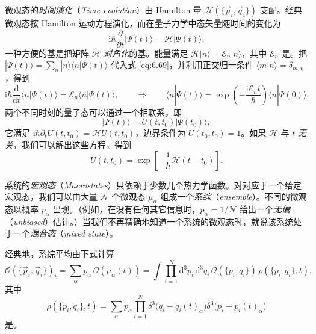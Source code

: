 \begin{itemize}[leftmargin=1.6em,itemsep=0.4em]
微观态的\emph{时间演化}（\textit{Time evolution}）由 Hamilton 量 $\mathscr H(\{\vec p_i,\vec q_i\})$ 支配。经典微观态按 Hamilton 运动方程演化，而在量子力学中态矢量随时间的变化为
\begin{equation}\label{eq:6.69}
\mathrm i\hbar\frac{\partial}{\partial t}|\Psi(t)\rangle=\mathscr H|\Psi(t)\rangle.
\end{equation}
一种方便的基是把矩阵 $\mathscr H$ \emph{对角化}的基。能量满足 $\mathscr H|n\rangle=\mathcal E_n|n\rangle$，其中 $\mathcal E_n$ 是。把 $|\Psi(t)\rangle=\sum_n|n\rangle\langle n|\Psi(t)\rangle$ 代入式 \eqref{eq:6.69}，并利用正交归一条件 $\langle m|n\rangle=\delta_{m,n}$，得到
\begin{equation}\label{eq:6.70}
\mathrm i\hbar\frac{\mathrm d}{\mathrm dt}\langle n|\Psi(t)\rangle=\mathcal E_n\langle n|\Psi(t)\rangle,\qquad\Longrightarrow\qquad\langle n|\Psi(t)\rangle=\exp\left(-\frac{\mathrm i\mathcal E_nt}\hbar\right)\langle n|\Psi(0)\rangle.
\end{equation}
两个不同时刻的量子态可以通过一个相联系，即
\begin{equation}\label{eq:6.71}
|\Psi(t)\rangle=U(t,t_0)|\Psi(t_0)\rangle,
\end{equation}
它满足 $\mathrm i\hbar\partial_tU(t,t_0)=\mathscr H U(t,t_0)$，边界条件为 $U(t_0,t_0)=1$。如果 $\mathscr H$ 与 $t$ \emph{无关}，我们可以解出这些方程，得到
\begin{equation}\label{eq:6.72}
U(t,t_0)=\exp\left[-\frac{\mathrm i}\hbar\mathscr H(t-t_0)\right].
\end{equation}
\end{itemize}



系统的\emph{宏观态}（\textit{Macrostates}）只依赖于少数几个热力学函数。对对应于一个给定宏观态，我们可以由大量 $\mathcal N$ 个微观态 $\mu_\alpha$ 组成一个\emph{系综}（\textit{ensemble}）。不同的微观态以概率 $p_\alpha$ 出现。（例如，在没有任何其它信息时，$p_\alpha=1/\mathcal N$ 给出一个\emph{无偏}（\textit{unbiased}）估计。）当我们不再精确地知道一个系统的微观态时，就说该系统处于一个\emph{混合态}（\textit{mixed state}）。

经典地，系综平均由下式计算
\begin{equation}\label{eq:6.73}
\overline{\mathcal O(\{\vec p_i,\vec q_i\})}_t=\sum_\alpha p_\alpha\,\mathcal O(\mu_\alpha(t))=\int\prod_{i=1}^N\mathrm d^3\tilde p_i\,\mathrm d^3\tilde q_i\,\mathcal O(\{\tilde p_i,\tilde q_i\})\,\rho(\{\tilde p_i,\tilde q_i\},t),
\end{equation}
其中
\begin{equation}\label{eq:6.74}
\rho(\{\tilde p_i,\tilde q_i\},t)=\sum_\alpha p_\alpha\prod_{i=1}^N\delta^3\big(\tilde q_i-\tilde q_i(t)_\alpha\big)\delta^3\big(\tilde p_i-\tilde p_i(t)_\alpha\big)
\end{equation}
是。

